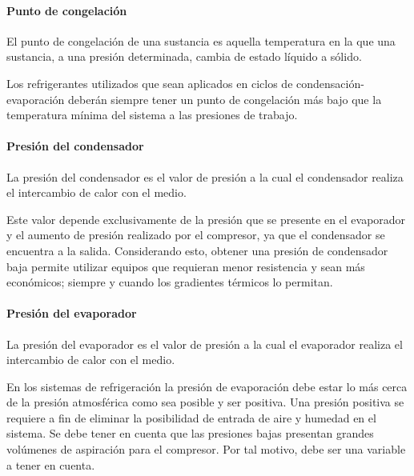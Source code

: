 	\paragraph{Punto de congelación} El punto de congelación de una sustancia es aquella temperatura en la que una sustancia, a una presión determinada, cambia de estado líquido a sólido. 

	Los refrigerantes utilizados que sean aplicados en ciclos de condensación-evaporación deberán siempre tener un punto de congelación más bajo que la temperatura mínima del sistema a las presiones de trabajo.

	\paragraph{Presión del condensador} La presión del condensador es el valor de presión a la cual el condensador realiza el intercambio de calor con el medio.

	Este valor depende exclusivamente de la presión que se presente en el evaporador y el aumento de presión realizado por el compresor, ya que el condensador se encuentra a la salida. Considerando esto, obtener una presión de condensador baja permite utilizar equipos que requieran menor resistencia y sean más económicos; siempre y cuando los gradientes térmicos lo permitan. 
	
	\paragraph{Presión del evaporador} La presión del evaporador es el valor de presión a la cual el evaporador realiza el intercambio de calor con el medio.

	En los sistemas de refrigeración la presión de evaporación debe estar lo más cerca de la presión atmosférica como sea posible y ser positiva. Una presión positiva se requiere a fin de eliminar la posibilidad de entrada de aire y humedad en el sistema. Se debe tener en cuenta que las presiones bajas presentan grandes volúmenes de aspiración para el compresor. Por tal motivo, debe ser una variable a tener en cuenta.


